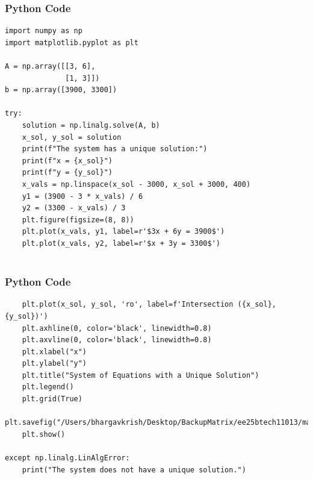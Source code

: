 \documentclass{beamer}
\begin{document}
\begin{frame}[fragile]
    \frametitle{Python Code}
    \begin{lstlisting}
import numpy as np
import matplotlib.pyplot as plt

A = np.array([[3, 6],
              [1, 3]])
b = np.array([3900, 3300])

try:
    solution = np.linalg.solve(A, b)
    x_sol, y_sol = solution
    print(f"The system has a unique solution:")
    print(f"x = {x_sol}")
    print(f"y = {y_sol}")
    x_vals = np.linspace(x_sol - 3000, x_sol + 3000, 400)
    y1 = (3900 - 3 * x_vals) / 6
    y2 = (3300 - x_vals) / 3
    plt.figure(figsize=(8, 8))
    plt.plot(x_vals, y1, label=r'$3x + 6y = 3900$')
    plt.plot(x_vals, y2, label=r'$x + 3y = 3300$')
    

    \end{lstlisting}
\end{frame}


\begin{frame}[fragile]
    \frametitle{Python Code}
    \begin{lstlisting}
    plt.plot(x_sol, y_sol, 'ro', label=f'Intersection ({x_sol}, {y_sol})')
    plt.axhline(0, color='black', linewidth=0.8)
    plt.axvline(0, color='black', linewidth=0.8)
    plt.xlabel("x")
    plt.ylabel("y")
    plt.title("System of Equations with a Unique Solution")
    plt.legend()
    plt.grid(True)
    plt.savefig("/Users/bhargavkrish/Desktop/BackupMatrix/ee25btech11013/matgeo/5.8.11/figs/Figure_1.png")
    plt.show()

except np.linalg.LinAlgError:
    print("The system does not have a unique solution.")

    \end{lstlisting}
\end{frame}
\end{document}
